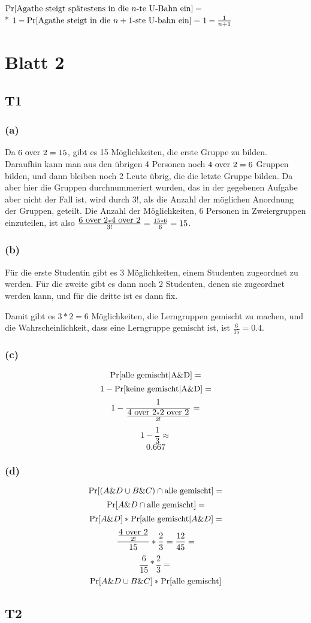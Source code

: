 \documentclass{article}
\begin{document}
$ \Pr[\hbox{Agathe steigt spätestens in die $n$-te U-Bahn ein}]=$\\*
$ 1-\Pr[\hbox{Agathe steigt in die $n+1$-ste U-bahn ein}]=1-\frac{1}{n+1} $

\section*{Blatt 2}

\subsection*{T1}

\subsubsection*{(a)}

Da $\hbox{6 over 2}=15$, gibt es 15 Möglichkeiten, die erste Gruppe
zu bilden. Daraufhin kann man aus den übrigen 4 Personen noch $\hbox{4
over 2}=6$ Gruppen bilden, und dann bleiben noch 2 Leute übrig, die die
letzte Gruppe bilden. Da aber hier die Gruppen durchnummeriert wurden,
das in der gegebenen Aufgabe aber nicht der Fall ist, wird durch $3!$,
als die Anzahl der möglichen Anordnung der Gruppen, geteilt.  Die Anzahl
der Möglichkeiten, 6 Personen in Zweiergruppen einzuteilen, ist also
$\frac{\hbox{6 over 2}*\hbox{4 over 2}}{3!}=\frac{15*6}{6}=15$.

\subsubsection*{(b)}

Für die erste Studentin gibt es 3 Möglichkeiten, einem Studenten
zugeordnet zu werden. Für die zweite gibt es dann noch 2 Studenten,
denen sie zugeordnet werden kann, und für die dritte ist es dann fix.

Damit gibt es $3*2=6$ Möglichkeiten, die Lerngruppen gemischt zu machen,
und die Wahrscheinlichkeit, dass eine Lerngruppe gemischt ist, ist
$\frac{6}{15}=0.4$.

\subsubsection*{(c)}

$$\Pr[\hbox{alle gemischt}|\hbox{A\&D}]=$$
$$1-\Pr[\hbox{keine gemischt}|\hbox{A\&D}]=$$
$$1-\frac{1}{\frac{\hbox{4 over 2}*\hbox{2 over 2}}{2!}}=$$
$$1-\frac{1}{3}\approx$$
$$0.667$$

\subsubsection*{(d)}

$$\Pr[(A\&D \cup B\&C) \cap \hbox{alle gemischt}]=$$
$$\Pr[A\&D \cap \hbox{alle gemischt}]=$$
$$\Pr[A\&D]*\Pr[\hbox{alle gemischt}|A\&D]=$$
$$\frac{\frac{\hbox{4 over 2}}{2!}}{15}*\frac{2}{3}=\frac{12}{45}=$$
$$\frac{6}{15}*\frac{2}{3}=$$
$$\Pr[A\&D \cup B\&C]*\Pr[\hbox{alle gemischt}]$$

\subsection*{T2}
\end{document}
